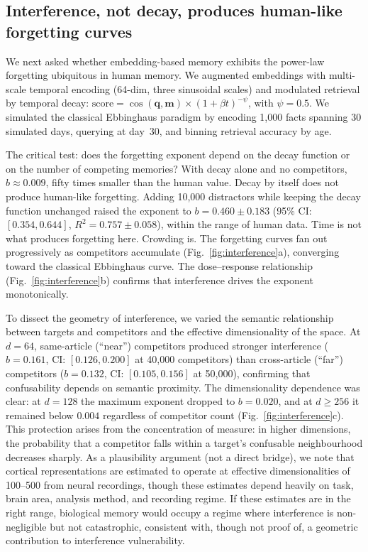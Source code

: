 \documentclass[11pt]{article}
\begin{document}
\subsection*{Interference, not decay, produces human-like forgetting curves}

We next asked whether embedding-based memory exhibits the power-law forgetting ubiquitous in human memory. We augmented embeddings with multi-scale temporal encoding (64-dim, three sinusoidal scales) and modulated retrieval by temporal decay: $\text{score} = \cos(\mathbf{q}, \mathbf{m}) \times (1 + \beta t)^{-\psi}$, with $\psi = 0.5$\cite{wixted1991}. We simulated the classical Ebbinghaus paradigm by encoding 1{,}000 facts spanning 30 simulated days, querying at day~30, and binning retrieval accuracy by age.

The critical test: does the forgetting exponent depend on the decay function or on the number of competing memories? With decay alone and no competitors, $b \approx 0.009$, fifty times smaller than the human value. Decay by itself does not produce human-like forgetting. Adding 10{,}000 distractors while keeping the decay function unchanged raised the exponent to $b = 0.460 \pm 0.183$ (95\% CI: $[0.354, 0.644]$, $R^2 = 0.757 \pm 0.058$), within the range of human data. Time is not what produces forgetting here. Crowding is. The forgetting curves fan out progressively as competitors accumulate (Fig.~\ref{fig:interference}a), converging toward the classical Ebbinghaus curve. The dose--response relationship (Fig.~\ref{fig:interference}b) confirms that interference drives the exponent monotonically\cite{bjork1992,anderson1991}.

To dissect the geometry of interference, we varied the semantic relationship between targets and competitors and the effective dimensionality of the space. At $d = 64$, same-article (``near'') competitors produced stronger interference ($b = 0.161$, CI: $[0.126, 0.200]$ at 40{,}000 competitors) than cross-article (``far'') competitors ($b = 0.132$, CI: $[0.105, 0.156]$ at 50{,}000), confirming that confusability depends on semantic proximity. The dimensionality dependence was clear: at $d = 128$ the maximum exponent dropped to $b = 0.020$, and at $d \geq 256$ it remained below $0.004$ regardless of competitor count (Fig.~\ref{fig:interference}c). This protection arises from the concentration of measure: in higher dimensions, the probability that a competitor falls within a target's confusable neighbourhood decreases sharply. As a plausibility argument (not a direct bridge), we note that cortical representations are estimated to operate at effective dimensionalities of 100--500 from neural recordings\cite{stringer2019,gao2017}, though these estimates depend heavily on task, brain area, analysis method, and recording regime. If these estimates are in the right range, biological memory would occupy a regime where interference is non-negligible but not catastrophic, consistent with, though not proof of, a geometric contribution to interference vulnerability.
\end{document}
